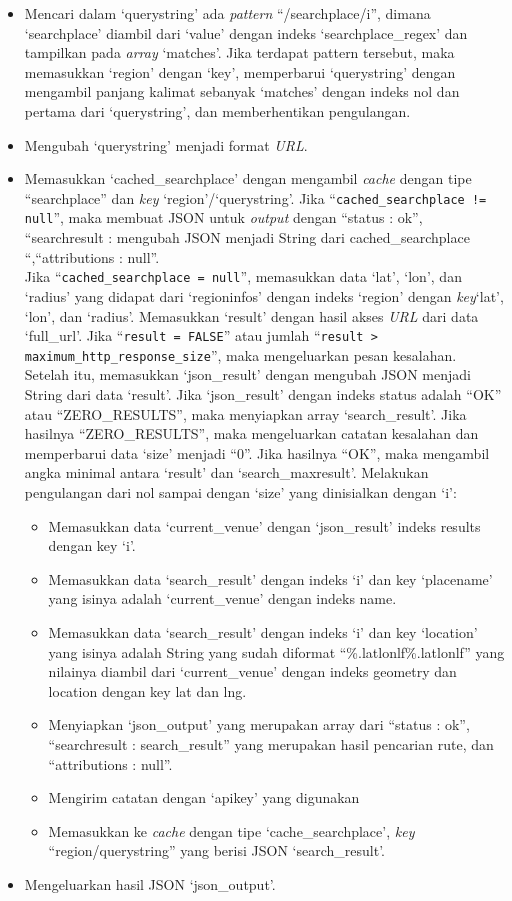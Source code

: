 \begin{itemize}
	\item Mencari dalam `querystring' ada \textit{pattern} ``/searchplace/i'', dimana `searchplace' diambil dari `value' dengan indeks `searchplace\_regex' dan tampilkan pada \textit{array} `matches'. Jika terdapat pattern tersebut, maka memasukkan `region' dengan `key', memperbarui `querystring' dengan mengambil panjang kalimat sebanyak `matches' dengan indeks nol dan pertama dari `querystring', dan memberhentikan pengulangan.
	\item Mengubah `querystring' menjadi format \textit{URL}.
	\item Memasukkan `cached\_searchplace' dengan mengambil \textit{cache} dengan tipe ``searchplace'' dan \textit{key} `region'/`querystring'. Jika ``\texttt{cached\_searchplace != null}'', maka membuat JSON untuk \textit{output} dengan ``status : ok'', ``searchresult : mengubah JSON menjadi String dari cached\_searchplace ``,``attributions : null''. \\
	Jika ``\texttt{cached\_searchplace = null}'', memasukkan data `lat', `lon', dan `radius' yang didapat dari `regioninfos' dengan indeks `region' dengan \textit{key}`lat', `lon', dan `radius'. Memasukkan `result' dengan hasil akses \textit{URL} dari data `full\_url'. Jika ``\texttt{result = FALSE}'' atau jumlah ``\texttt{result > maximum\_http\_response\_size}'', maka mengeluarkan pesan kesalahan. Setelah itu, memasukkan `json\_result' dengan mengubah JSON menjadi String dari data `result'. Jika `json\_result' dengan indeks status adalah ``OK'' atau ``ZERO\_RESULTS'', maka menyiapkan array `search\_result'. Jika hasilnya ``ZERO\_RESULTS'', maka mengeluarkan catatan kesalahan dan memperbarui data `size' menjadi ``0''. Jika hasilnya ``OK'', maka mengambil angka minimal antara `result' dan `search\_maxresult'. Melakukan pengulangan dari nol sampai dengan `size' yang dinisialkan dengan `i':
	\begin{itemize}
		\item Memasukkan data `current\_venue' dengan `json\_result' indeks results dengan key `i'.
		\item Memasukkan data `search\_result' dengan indeks `i' dan key `placename' yang isinya adalah `current\_venue' dengan indeks name.
		\item Memasukkan data `search\_result' dengan indeks `i' dan key `location' yang isinya adalah String yang sudah diformat ``\%.latlonlf\%.latlonlf'' yang nilainya diambil dari `current\_venue' dengan indeks geometry dan location dengan key lat dan lng.
		\item Menyiapkan `json\_output' yang merupakan array dari ``status : ok'', ``searchresult : search\_result'' yang merupakan hasil pencarian rute, dan ``attributions : null''.
		\item Mengirim catatan dengan `apikey' yang digunakan
		\item Memasukkan ke \textit{cache} dengan tipe `cache\_searchplace', \textit{key} ``region/querystring'' yang berisi JSON `search\_result'.
	\end{itemize}
	\item Mengeluarkan hasil JSON `json\_output'.
\end{itemize}

